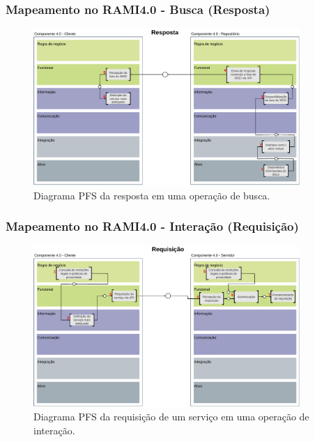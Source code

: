 \documentclass[10pt]{beamer}
\begin{document}
\begin{frame}
	\frametitle{Mapeamento no RAMI4.0 - Busca (Resposta)}
	
	\begin{figure}[htb]
		\centering
		\caption{Diagrama PFS da resposta em uma operação de busca.}
		\label{fig:rami-busca-resposta}
		\includegraphics[width=0.9\textwidth]{rami-busca-resposta}

	\end{figure}

\end{frame}
\begin{frame}
	\frametitle{Mapeamento no RAMI4.0 - Interação (Requisição)}
	
	\begin{figure}[htb]
		\centering
		\caption{Diagrama PFS da requisição de um serviço em uma operação de interação.}
		\label{fig:rami-interacao-requisicao}
		\includegraphics[width=0.9\textwidth]{rami-interacao-requisicao}
	
	\end{figure}
	
\end{frame}
\end{document}
